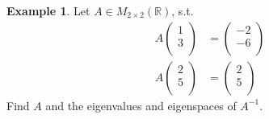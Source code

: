 \documentclass[fleqn, a4paper, 12pt]{article}
\theoremstyle{definition}
\newtheorem{example}{Example}
\theoremstyle{theorem}
\begin{document}
\begin{example}
	Let $A \in M_{2 \times 2} (\mathbb{R})$, s.t.
	\begin{align*}
		A
			\begin{pmatrix}
				1\\
				3\\
			\end{pmatrix}
		&= 
			\begin{pmatrix}
				-2\\
				-6\\
			\end{pmatrix}\\
		A
			\begin{pmatrix}
				2\\
				5\\
			\end{pmatrix}
		&= 
			\begin{pmatrix}
				2\\
				5\\
			\end{pmatrix}
	\end{align*}
	Find $A$ and the eigenvalues and eigenspaces of $A^{-1}$.
\end{example}
\end{document}
